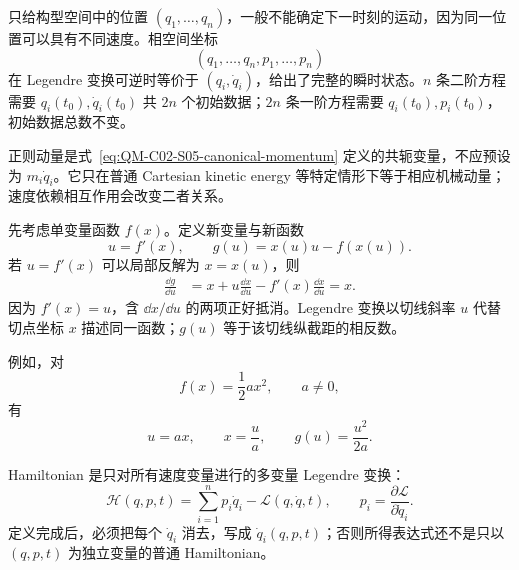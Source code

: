 只给构型空间中的位置 $(q_1,\ldots,q_n)$，一般不能确定下一时刻的运动，因为同一位置可以具有不同速度。相空间坐标
\begin{equation}
  (q_1,\ldots,q_n,p_1,\ldots,p_n)
  \label{eq:QM-C02-S05-phase-point}
\end{equation}
在 Legendre 变换可逆时等价于 $(q_i,\dot q_i)$，给出了完整的瞬时状态。$n$ 条二阶方程需要 $q_i(t_0),\dot q_i(t_0)$ 共 $2n$ 个初始数据；$2n$ 条一阶方程需要 $q_i(t_0),p_i(t_0)$，初始数据总数不变。

正则动量是式~\eqref{eq:QM-C02-S05-canonical-momentum} 定义的共轭变量，不应预设为 $m_i\dot q_i$。它只在普通 Cartesian kinetic energy 等特定情形下等于相应机械动量；速度依赖相互作用会改变二者关系。


先考虑单变量函数 $f(x)$。定义新变量与新函数
\begin{equation}
  u=f'(x),
  \qquad
  g(u)=x(u)u-f(x(u)).
  \label{eq:QM-C02-S05-legendre-one-variable}
\end{equation}
若 $u=f'(x)$ 可以局部反解为 $x=x(u)$，则
\begin{align}
  \frac{\dd g}{\dd u}
  &=x+u\frac{\dd x}{\dd u}
    -f'(x)\frac{\dd x}{\dd u}
    =x.
  \label{eq:QM-C02-S05-legendre-derivative}
\end{align}
因为 $f'(x)=u$，含 $\dd x/\dd u$ 的两项正好抵消。Legendre 变换以切线斜率 $u$ 代替切点坐标 $x$ 描述同一函数；$g(u)$ 等于该切线纵截距的相反数。

例如，对
\[
  f(x)=\frac12ax^2,
  \qquad a\neq0,
\]
有
\begin{equation}
  u=ax,
  \qquad
  x=\frac ua,
  \qquad
  g(u)=\frac{u^2}{2a}.
  \label{eq:QM-C02-S05-quadratic-legendre}
\end{equation}

Hamiltonian 是只对所有速度变量进行的多变量 Legendre 变换：
\begin{equation}
  \boxed{
  \mathcal H(q,p,t)
  =\sum_{i=1}^{n}p_i\dot q_i-\mathcal L(q,\dot q,t),
  \qquad
  p_i=\frac{\partial\mathcal L}{\partial\dot q_i}.}
  \label{eq:QM-C02-S05-hamiltonian-definition}
\end{equation}
定义完成后，必须把每个 $\dot q_i$ 消去，写成 $\dot q_i(q,p,t)$；否则所得表达式还不是只以 $(q,p,t)$ 为独立变量的普通 Hamiltonian。


